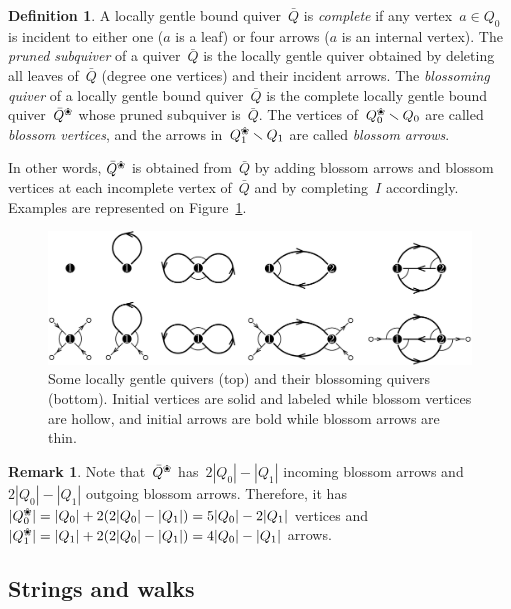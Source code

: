 \documentclass{amsart}
\theoremstyle{definition}
\newtheorem{definition}[theorem]{Definition}
\newtheorem{remark}[theorem]{Remark}
\newcommand{\ssm}{\smallsetminus} %
\newcommand{\fref}[1]{Figure~\ref{#1}} %
\newcommand{\darkblue}{\color{darkblue}} %
\newcommand{\defn}[1]{\textsl{\darkblue #1}} %
\newcommand{\blossom}{^\text{\ding{96}}} %
\begin{document}
\begin{definition}
\label{def:blossomingQuiver}
A locally gentle bound quiver~$\bar Q$ is \defn{complete} if any vertex~$a \in Q_0$ is incident to either one ($a$ is a leaf) or four arrows ($a$ is an internal vertex).
The \defn{pruned subquiver} of a quiver~$\bar Q$ is the locally gentle quiver obtained by deleting all leaves of~$\bar Q$ (degree one vertices) and their incident arrows.
The \defn{blossoming quiver} of a locally gentle bound quiver~$\bar Q$ is the complete locally gentle bound quiver~$\bar Q\blossom$ whose pruned subquiver is~$\bar Q$.
The vertices of~$Q\blossom_0 \ssm Q_0$ are called \defn{blossom vertices}, and the arrows in~$Q\blossom_1 \ssm Q_1$ are called \defn{blossom arrows}.
\end{definition}

In other words, $\bar Q\blossom$ is obtained from~$\bar Q$ by adding blossom arrows and blossom vertices at each incomplete vertex of~$\bar Q$ and by completing~$I$ accordingly.
Examples are represented on \fref{fig:quivers}.

\begin{figure}[t]
	\capstart
	\centerline{\includegraphics[scale=.6]{quivers}}
	\caption{Some locally gentle quivers (top) and their blossoming quivers (bottom). Initial vertices are solid and labeled while blossom vertices are hollow, and initial arrows are bold while blossom arrows are thin.}
	\label{fig:quivers}
\end{figure}

\begin{remark}
\label{rem:sizeBlossomingQuiver}
Note that~$\bar Q\blossom$ has~$2|Q_0|-|Q_1|$ incoming blossom arrows and~$2|Q_0|-|Q_1|$ outgoing blossom arrows.
Therefore, it has $|Q_0\blossom| = |Q_0| + 2(2|Q_0|-|Q_1|) = 5|Q_0|-2|Q_1|$ vertices and~${|Q_1\blossom| = |Q_1| + 2(2|Q_0|-|Q_1|) = 4|Q_0|-|Q_1|}$ arrows.
\end{remark}

\subsection{Strings and walks}
\end{document}
